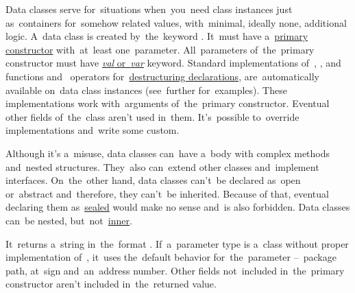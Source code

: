 \label{kotlindataclass}
Data classes serve for~situations when~you~need class instances just as~containers for~somehow related values, with~minimal, ideally none, additional logic.
A~data class is created by~the~keyword .
It~must have a~\hyperref[kotlinprimaryconstructor]{primary constructor} with~at~least one~parameter.
All~parameters of~the~primary constructor must have \hyperref[kotlinvalvar]{\textit{val} \mbox{or \textit{var}}} keyword.
Standard implementations \mbox{of }, ,  \mbox{and } functions \mbox{and } operators for~\hyperref[kotlindestdecl]{destructuring declarations}, are~automatically available on~data class instances (see~further for~examples).
These implementations work with~arguments of~the~primary constructor.
Eventual other fields of~the~class aren't used in~them.
It's~possible to~override implementations and~write some custom.

Although it's a~misuse, data classes can~have a~body with complex methods and~nested structures.
They~also can~extend other classes and~implement interfaces.
On~the~other hand, data classes can't~be declared as~open or~abstract and~therefore, they can't~be inherited.
Because of that, eventual declaring them as~\hyperref[kotlinsealedclass]{sealed} would make no sense and~is also forbidden.
Data classes can~be nested, but~not~\hyperref[kotlininnerclass]{inner}.

\label{kotlindataclasstostring}
It~returns a~string in~the~format .
If~a~parameter type is a~class without proper implementation \mbox{of }, it~uses the~default behavior for~the~parameter --~package path, at~sign and~an~address number.
Other fields not~included in~the~primary constructor aren't included in~the~returned value.

